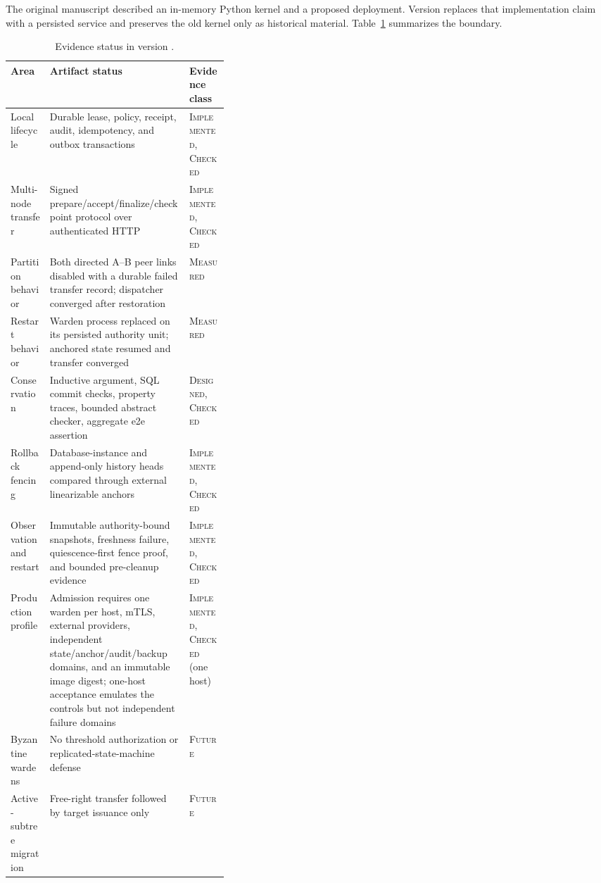 \documentclass[10pt]{article}
\newcommand{\impl}{\textsc{Implemented}}
\newcommand{\measured}{\textsc{Measured}}
\newcommand{\checked}{\textsc{Checked}}
\newcommand{\designed}{\textsc{Designed}}
\newcommand{\future}{\textsc{Future}}
\begin{document}
The original manuscript described an in-memory Python kernel and a proposed deployment. Version
\ArtifactVersion{} replaces that implementation claim with a persisted service and preserves the
old kernel only as historical material. Table~\ref{tab:status} summarizes the boundary.

\begin{table}[ht]
\centering
\caption{Evidence status in version \ArtifactVersion.}
\label{tab:status}
\small
\begin{tabularx}{\linewidth}{@{}p{0.18\linewidth}X p{0.18\linewidth}@{}}
\toprule
Area & Artifact status & Evidence class \\
\midrule
Local lifecycle & Durable lease, policy, receipt, audit, idempotency, and outbox transactions & \impl, \checked \\
Multi-node transfer & Signed prepare/accept/finalize/checkpoint protocol over authenticated HTTP & \impl, \checked \\
Partition behavior & Both directed A--B peer links disabled with a durable failed transfer record; dispatcher converged after restoration & \measured \\
Restart behavior & Warden process replaced on its persisted authority unit; anchored state resumed and transfer converged & \measured \\
Conservation & Inductive argument, SQL commit checks, property traces, bounded abstract checker, aggregate e2e assertion & \designed, \checked \\
Rollback fencing & Database-instance and append-only history heads compared through external linearizable anchors & \impl, \checked \\
Observation and restart & Immutable authority-bound snapshots, freshness failure, quiescence-first fence proof, and bounded pre-cleanup evidence & \impl, \checked \\
Production profile & Admission requires one warden per host, mTLS, external providers, independent state/anchor/audit/backup domains, and an immutable image digest; one-host acceptance emulates the controls but not independent failure domains & \impl, \checked{} (one host) \\
Byzantine wardens & No threshold authorization or replicated-state-machine defense & \future \\
Active-subtree migration & Free-right transfer followed by target issuance only & \future \\
\bottomrule
\end{tabularx}
\end{table}
\end{document}
